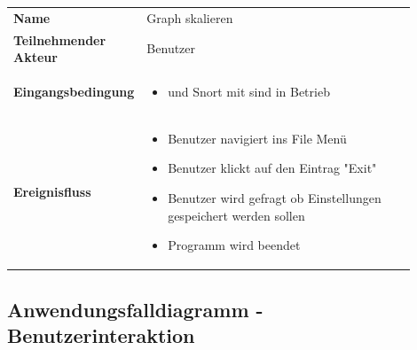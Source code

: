 \begin{tabular}{lp{0.9\linewidth}}
\textbf{Name} & Graph skalieren \\

\textbf{Teilnehmender Akteur} & Benutzer \\

\textbf{Eingangsbedingung} &
				\begin{minipage}[t]{\linewidth}
				\begin{itemize}[nosep,after=\strut,leftmargin=10pt]

				\item \programname und Snort mit \sppname sind in Betrieb

				\end{itemize}
				\end{minipage} \\
\textbf{Ereignisfluss} &
				\begin{minipage}[t]{\linewidth}
				\begin{itemize}[nosep,after=\strut,leftmargin=10pt]
				\item Benutzer navigiert ins File Menü
				\item Benutzer klickt auf den Eintrag "Exit"
				\item Benutzer wird gefragt ob Einstellungen gespeichert werden sollen
				\item Programm wird beendet
				\end{itemize}
				\end{minipage} \\
\end{tabular}

\pagebreak

\subsection*{Anwendungsfalldiagramm - Benutzerinteraktion}

